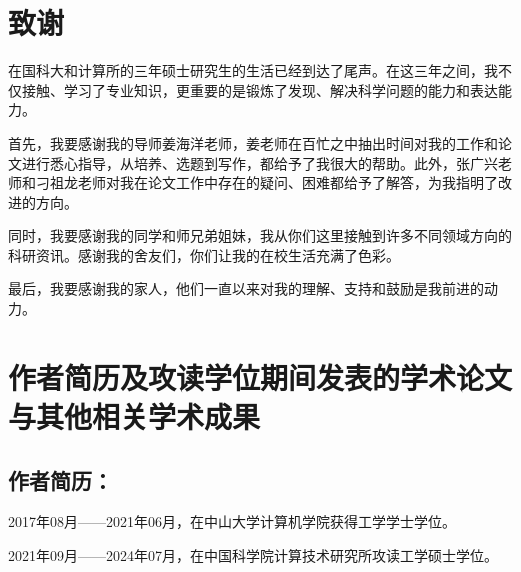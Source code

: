\chapter[致谢]{致\quad 谢}%

在国科大和计算所的三年硕士研究生的生活已经到达了尾声。在这三年之间，我不仅接触、学习了专业知识，更重要的是锻炼了发现、解决科学问题的能力和表达能力。

首先，我要感谢我的导师姜海洋老师，姜老师在百忙之中抽出时间对我的工作和论文进行悉心指导，从培养、选题到写作，都给予了我很大的帮助。此外，张广兴老师和刁祖龙老师对我在论文工作中存在的疑问、困难都给予了解答，为我指明了改进的方向。

同时，我要感谢我的同学和师兄弟姐妹，我从你们这里接触到许多不同领域方向的科研资讯。感谢我的舍友们，你们让我的在校生活充满了色彩。

最后，我要感谢我的家人，他们一直以来对我的理解、支持和鼓励是我前进的动力。


\chapter{作者简历及攻读学位期间发表的学术论文与其他相关学术成果}

\section*{作者简历：}
2017年08月——2021年06月，在中山大学计算机学院获得工学学士学位。

2021年09月——2024年07月，在中国科学院计算技术研究所攻读工学硕士学位。








\cleardoublepage[plain]%
